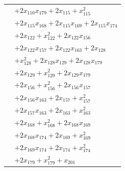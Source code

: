 \begin{longtable}{@{}r@{\;}l@{}}
 & \(\displaystyle +2x_{110}x_{179} +2x_{115} +x_{115}^{2}\) \\
 & \(\displaystyle +2x_{115}x_{168} +2x_{115}x_{169} +2x_{115}x_{174}\) \\
 & \(\displaystyle +2x_{122} +x_{122}^{2} +2x_{122}x_{156}\) \\
 & \(\displaystyle +2x_{122}x_{157} +2x_{122}x_{163} +2x_{128}\) \\
 & \(\displaystyle +x_{128}^{2} +2x_{128}x_{129} +2x_{128}x_{179}\) \\
 & \(\displaystyle +2x_{129} +x_{129}^{2} +2x_{129}x_{179}\) \\
 & \(\displaystyle +2x_{156} +x_{156}^{2} +2x_{156}x_{157}\) \\
 & \(\displaystyle +2x_{156}x_{163} +2x_{157} +x_{157}^{2}\) \\
 & \(\displaystyle +2x_{157}x_{163} +2x_{163} +x_{163}^{2}\) \\
 & \(\displaystyle +2x_{168} +x_{168}^{2} +2x_{168}x_{169}\) \\
 & \(\displaystyle +2x_{168}x_{174} +2x_{169} +x_{169}^{2}\) \\
 & \(\displaystyle +2x_{169}x_{174} +2x_{174} +x_{174}^{2}\) \\
 & \(\displaystyle +2x_{179} +x_{179}^{2} +x_{201}\) \\[3pt]
\end{longtable}
\endgroup
